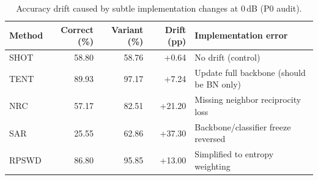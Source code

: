 \begin{table}[!t]
\centering
\footnotesize
\caption{Accuracy drift caused by subtle implementation changes at 0\,dB (P0 audit).}
\label{tab:impl}
\begin{tabular}{lrrrl}
\toprule
Method & Correct (\%) & Variant (\%) & Drift (pp) & Implementation error \\
\midrule
SHOT & 58.80 & 58.76 & +0.64 & No drift (control) \\
TENT & 89.93 & 97.17 & +7.24 & Update full backbone (should be BN only) \\
NRC & 57.17 & 82.51 & +21.20 & Missing neighbor reciprocity loss \\
SAR & 25.55 & 62.86 & +37.30 & Backbone/classifier freeze reversed \\
RPSWD & 86.80 & 95.85 & +13.00 & Simplified to entropy weighting \\
\bottomrule
\end{tabular}
\end{table}

